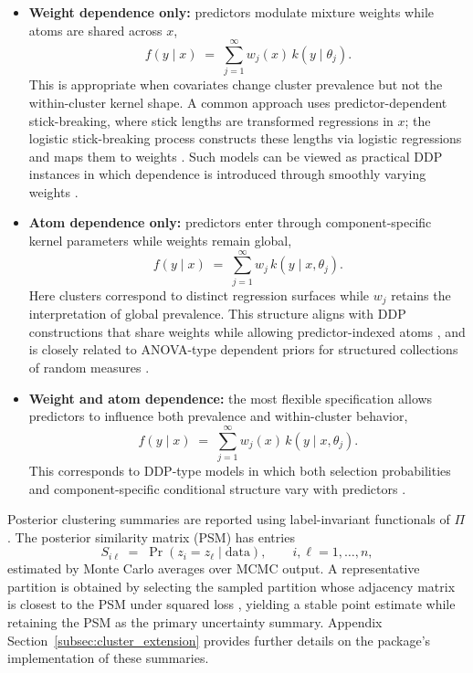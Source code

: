 \documentclass[article]{jss}\usepackage[]{graphicx}\usepackage[]{xcolor}
\begin{document}
\begin{itemize}
\item \textbf{Weight dependence only:} predictors modulate mixture
weights while atoms are shared across $x$,
\begin{equation}
f(y\mid x) \;=\; \sum_{j=1}^{\infty} w_j(x)\, k\!\left(y\mid \theta_j\right).
\label{eq:clust_weights_only}
\end{equation}
This is appropriate when covariates change cluster prevalence but not
the within-cluster kernel shape. A common approach uses
predictor-dependent stick-breaking, where stick lengths are transformed
regressions in $x$; the logistic stick-breaking process constructs
these lengths via logistic regressions and maps them to weights
\citep{Ren2011}. Such models can be viewed as practical DDP instances in
which dependence is introduced through smoothly varying weights
\citep{MacEachern2000,Quintana2022}.

\item \textbf{Atom dependence only:} predictors enter through
component-specific kernel parameters while weights remain global,
\begin{equation}
f(y\mid x) \;=\; \sum_{j=1}^{\infty} w_j\, k\!\left(y\mid x,\theta_j\right).
\label{eq:clust_param_only}
\end{equation}
Here clusters correspond to distinct regression surfaces while $w_j$
retains the interpretation of global prevalence. This structure aligns
with DDP constructions that share weights while allowing
predictor-indexed atoms \citep{MacEachern1999,MacEachern2000}, and is
closely related to ANOVA-type dependent priors for structured
collections of random measures \citep{DeIorio2004}.

\item \textbf{Weight and atom dependence:} the most flexible
specification allows predictors to influence both prevalence and
within-cluster behavior,
\begin{equation}
f(y\mid x) \;=\; \sum_{j=1}^{\infty} w_j(x)\, k\!\left(y\mid x,\theta_j\right).
\label{eq:clust_both}
\end{equation}
This corresponds to DDP-type models in which both selection
probabilities and component-specific conditional structure vary with
predictors \citep{Quintana2022}.
\end{itemize}

Posterior clustering summaries are reported using label-invariant
functionals of $\Pi$. The posterior similarity matrix (PSM) has entries
\begin{equation}
S_{i\ell} \;=\; \Pr(z_i=z_\ell \mid \text{data}), \qquad i,\ell=1,\ldots,n,
\label{eq:psm}
\end{equation}
estimated by Monte Carlo averages over MCMC output. A representative
partition is obtained by selecting the sampled partition whose adjacency
matrix is closest to the PSM under squared loss \citep{Dahl2006},
yielding a stable point estimate while retaining the PSM as the primary
uncertainty summary. Appendix
Section~\ref{subsec:cluster_extension} provides further
details on the package's implementation of these summaries.
\end{document}
